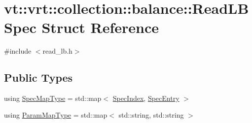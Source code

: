 \hypertarget{structvt_1_1vrt_1_1collection_1_1balance_1_1_read_l_b_spec}{}\section{vt\+:\+:vrt\+:\+:collection\+:\+:balance\+:\+:Read\+L\+B\+Spec Struct Reference}
\label{structvt_1_1vrt_1_1collection_1_1balance_1_1_read_l_b_spec}


{\ttfamily \#include $<$read\+\_\+lb.\+h$>$}

\subsection*{Public Types}
\begin{DoxyCompactItemize}
\item 
using \hyperlink{structvt_1_1vrt_1_1collection_1_1balance_1_1_read_l_b_spec_aa73c3611c615832402eeeed6fb7b8049}{Spec\+Map\+Type} = std\+::map$<$ \hyperlink{namespacevt_1_1vrt_1_1collection_1_1balance_a72a5e0d9936ddf57f8e6c64e0e9fd123}{Spec\+Index}, \hyperlink{structvt_1_1vrt_1_1collection_1_1balance_1_1_spec_entry}{Spec\+Entry} $>$
\item 
using \hyperlink{structvt_1_1vrt_1_1collection_1_1balance_1_1_read_l_b_spec_a05e30b32f0ca5df2cb160514fa0eeb41}{Param\+Map\+Type} = std\+::map$<$ std\+::string, std\+::string $>$
\end{DoxyCompactItemize}

